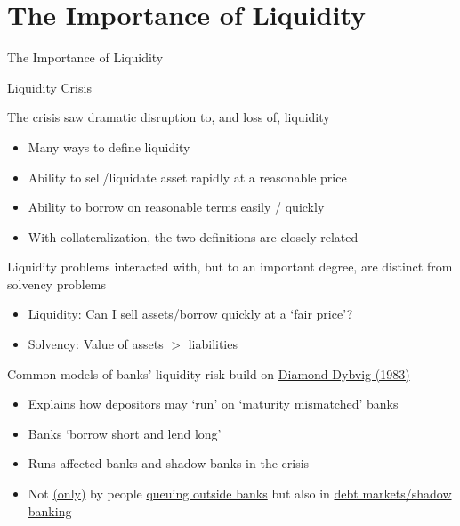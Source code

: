 \section{The Importance of Liquidity}

\begin{frame}

\begin{center}
{\LARGE The Importance of Liquidity}
\end{center}

\end{frame}



\begin{frame}{Liquidity Crisis}

The crisis saw dramatic disruption to, and loss of, liquidity
	\begin{itemize}
	\item	Many ways to define liquidity
	\item	Ability to sell/liquidate asset rapidly at a reasonable price
	\item	Ability to borrow on reasonable terms easily / quickly
	\item	With collateralization, the two definitions are closely related
	\end{itemize}
\vspace{1.5mm}
Liquidity problems interacted with, but to an important degree, are distinct from solvency problems
	\begin{itemize}
	\item	Liquidity: Can I sell assets/borrow quickly at a `fair price'?
	\item	Solvency: Value of assets $>$ liabilities
	\end{itemize}
\vspace{1.5mm}	
Common models of banks' liquidity risk build on \href{https://www.jstor.org/stable/1837095}{Diamond-Dybvig (1983)}
	\begin{itemize}
	\item	Explains how depositors may `run' on `maturity mismatched' banks
	\item	Banks `borrow short and lend long'
	\item	Runs affected banks and shadow banks in the crisis
	\item	Not \href{https://en.wikipedia.org/wiki/Northern_Rock}{(only)} by people \href{https://www.theatlantic.com/business/archive/2016/12/its-a-wonderful-life-banking/511592/}{queuing outside banks} but also in \href{https://www.reuters.com/article/uk-shadow-banking-qa/qa-what-is-shadow-banking-and-why-does-it-matter-idUKTRE81611Q20120207}{debt markets/shadow banking}
	\end{itemize}

\end{frame}

